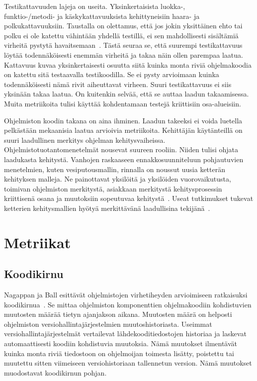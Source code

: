 \documentclass[finnish]{../tktltiki2}
\theoremstyle{definition}
\theoremstyle{remark}
\begin{document}
    Testikattavuuden lajeja on useita. Yksinkertaisista luokka-,\\funktio-/metodi- ja käskykattavuuksista kehittyneisiin 
haara- ja polkukattavuuksiin. Taustalla on olettamus, että jos jokin yksittäinen ehto tai polku ei ole katettu vähintään 
yhdellä testillä, ei sen mahdollisesti sisältämiä virheitä pystytä havaitsemaan~\cite{MND09}. Tästä seuraa se, että 
suurempi testikattavuus löytää todennäköisesti enemmän virheitä ja takaa näin ollen parempaa laatua. Kattavuus kuvaa
yksinkertaisesti osuutta siitä kuinka monta riviä ohjelmakoodia on katettu sitä testaavalla testikoodilla. Se ei pysty 
arvioimaan kuinka todennäköisesti nämä rivit aiheuttavat virheen. Suuri testikattavuus ei siis yksinään takaa laatua. On 
kuitenkin selvää, että se auttaa laadun takaamisessa. Muita metriikoita tulisi käyttää kohdentamaan testejä kriittisiin 
osa-alueisiin.

    Ohjelmiston koodin takana on aina ihminen.  Laadun takeeksi ei voida luetella pelkästään mekaanisia laatua arvioivia 
metriikoita. Kehittäjän käytänteillä on suuri laadullinen merkitys ohjelman kehitysvaiheissa. 
Ohjelmistotuotantomenetelmät nousevat suureen rooliin. Niiden tulisi ohjata laadukasta kehitystä. Vanhojen raskaaseen 
ennakkosuunniteluun pohjautuvien menetelmien, kuten vesiputousmallin, rinnalla on noussut uusia ketterän kehityksen 
malleja. Ne painottavat yksilöitä ja yksilöiden vuorovaikutusta, toimivan ohjelmiston merkitystä, asiakkaan merkitystä 
kehitysprosessin kriittisenä osana ja muutoksiin sopeutuvaa kehitystä~\cite{BBB00}. Useat tutkimukset tukevat ketterien 
kehitysmallien hyötyä merkittävänä laadullisina tekijänä~\cite{SS10}. 

\section{Metriikat}

\subsection{Koodikirnu}

Nagappan ja Ball esittävät ohjelmistojen virhetiheyden arvioimiseen ratkaisuksi koodikirnua~\cite{NB05}. Se mittaa 
ohjelmiston komponenttien ohjelmakoodiin kohdistuvien muutosten määrää tietyn ajanjakson aikana. Muutosten määrä on 
helposti ohjelmiston versiohallintajärjestelmien muutoshistoriasta. Useimmat versiohallintajärjestelmät vertailevat 
lähdekooditiedostojen historiaa ja laskevat automaattisesti koodiin kohdistuvia muutoksia. Nämä muutokset ilmentävät 
kuinka monta riviä tiedostoon on ohjelmoijan toimesta lisätty, poistettu tai muutettu sitten viimeiseen versiohistoriaan 
tallennetun version. Nämä muutokset muodostavat koodikirnun pohjan.
\end{document}
